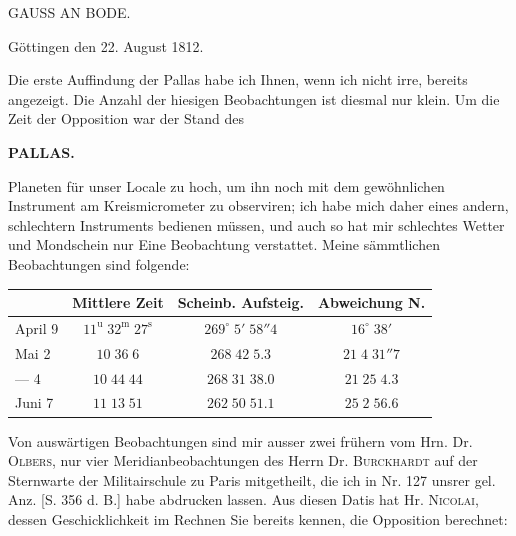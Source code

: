 \par{}\bigskip
\hypertarget{native-362-lower}{}\label{native-362-lower}
\begin{center}
\large GAUSS AN BODE.
\end{center}

\begin{flushright}Göttingen den 22. August 1812.\end{flushright}
\par\indent Die erste Auffindung der Pallas habe ich Ihnen, wenn ich nicht irre, bereits
angezeigt. Die Anzahl der hiesigen Beobachtungen ist diesmal nur klein. Um
die Zeit der Opposition war der Stand des
\par
{}
\clearpage
\thispagestyle{empty}
\noindent{}%
%
\parbox[t]{\dimexpr\linewidth-24mm\relax}{\centering\footnotesize\bfseries PALLAS.\par}%
\makebox[12mm][r]{}\par\nobreak\medskip
\noindent Planeten für unser Locale zu hoch, um ihn noch mit dem gewöhnlichen
Instrument am Kreismicrometer zu observiren; ich habe mich daher eines
andern, schlechtern Instruments bedienen müssen, und auch so hat mir
schlechtes Wetter und Mondschein nur Eine Beobachtung verstattet. Meine
sämmtlichen Beobachtungen sind folgende:

\begin{center}\fontsize{10}{12}\selectfont\setlength{\tabcolsep}{4pt}\renewcommand{\arraystretch}{1.15}\begin{tabular}{l|c|c|c}
& Mittlere Zeit & Scheinb. Aufsteig. & Abweichung N.\\\hline
April 9 & $11^{\mathrm u}\;32^{\mathrm m}\;27^{\mathrm s}$ & $269^\circ\;5'\;58''4$ & $16^\circ\;38'$\\
Mai 2 & $10\;36\;6$ & $268\;42\;5.3$ & $21\;4\;31''7$\\
— 4 & $10\;44\;44$ & $268\;31\;38.0$ & $21\;25\;4.3$\\
Juni 7 & $11\;13\;51$ & $262\;50\;51.1$ & $25\;2\;56.6$\\
\end{tabular}\end{center}

\par\indent Von auswärtigen Beobachtungen sind mir ausser zwei frühern vom Hrn. Dr.
\textsc{Olbers}, nur vier Meridianbeobachtungen des Herrn Dr. \textsc{Burckhardt} auf der
Sternwarte der Militairschule zu Paris mitgetheilt, die ich in Nr. 127
unsrer gel. Anz. [S. 356 d. B.] habe abdrucken lassen. Aus diesen Datis hat
Hr. \textsc{Nicolai}, dessen Geschicklichkeit im Rechnen Sie bereits kennen, die
Opposition berechnet:

